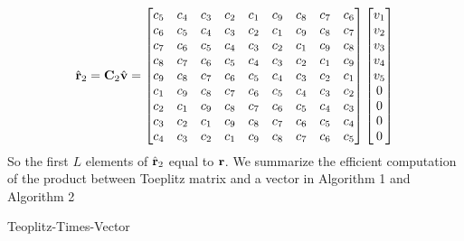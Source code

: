 \documentclass[revised,endfloat]{geophysics}
\DeclarePairedDelimiter\floor{\lfloor}{\rfloor}
\begin{document}
\begin{equation}
\hat{\bf r}_2 = {\bf C}_2 \hat{\bf v} = \begin{bmatrix}
c_5 & c_4 & c_3 & c_2 & c_1 & c_9 &  c_8 & c_7 & c_6 \\ 
c_6 & c_5 & c_4 & c_3 & c_2 & c_1 &  c_9 & c_8 & c_7 \\ 
c_7 & c_6 & c_5 & c_4 & c_3 & c_2 &  c_1 & c_9 & c_8 \\ 
c_8 & c_7 & c_6 & c_5 & c_4 & c_3 &  c_2 & c_1 & c_9 \\ 
c_9 & c_8 & c_7 & c_6 & c_5 & c_4 &  c_3 & c_2 & c_1 \\ 
c_1 & c_9 & c_8 & c_7 & c_6 & c_5 &  c_4 & c_3 & c_2 \\ 
c_2 & c_1 & c_9 & c_8 & c_7 & c_6 &  c_5 & c_4 & c_3 \\ 
c_3 & c_2 & c_1 & c_9 & c_8 & c_7 &  c_6 & c_5 & c_4 \\ 
c_4 & c_3 & c_2 & c_1 & c_9 & c_8 &  c_7 & c_6 & c_5 \\ 
\end{bmatrix}
\begin{bmatrix}
v_1 \\
v_2 \\
v_3 \\
v_4 \\
v_5 \\
0 \\
0 \\
0 \\
0 \\
\end{bmatrix}
\end{equation}
So the first $L$ elements of $\hat{\bf r}_2$ equal to ${\bf r}$. We summarize the efficient computation of the product between Toeplitz matrix and a vector in Algorithm 1 and Algorithm 2
\begin{algorithm}
      \SetAlgoLined
      \caption{Teoplitz-Times-Vector}
\end{algorithm}
\end{document}
